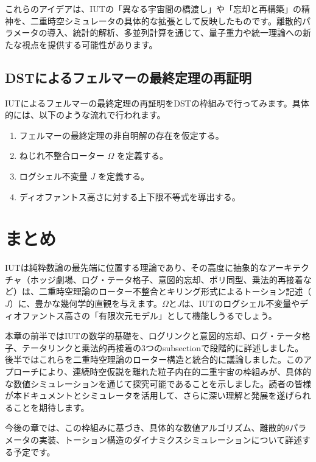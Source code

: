 \documentclass[a4paper,12pt,notitlepage]{jsreport}
\begin{document}
これらのアイデアは、IUTの「異なる宇宙間の橋渡し」や「忘却と再構築」の精神を、二重時空シミュレータの具体的な拡張として反映したものです。離散的パラメータの導入、統計的解析、多並列計算を通じて、量子重力や統一理論への新たな視点を提供する可能性があります。

\subsection{DSTによるフェルマーの最終定理の再証明}

IUTによるフェルマーの最終定理の再証明をDSTの枠組みで行ってみます。具体的には、以下のような流れで行われます。

\begin{enumerate}
  \item フェルマーの最終定理の非自明解の存在を仮定する。
  \item ねじれ不整合ローター $\Omega$ を定義する。
  \item ログシェル不変量 $J$ を定義する。
  \item ディオファントス高さに対する上下限不等式を導出する。
\end{enumerate}


\section{まとめ}

IUTは純粋数論の最先端に位置する理論であり、その高度に抽象的なアーキテクチャ（ホッジ劇場、ログ・テータ格子、意図的忘却、ポリ同型、乗法的再接着など）は、二重時空理論のローター不整合とキリング形式によるトーション記述（$J$）に、豊かな幾何学的直観を与えます。$\Omega$と$J$は、IUTのログシェル不変量やディオファントス高さの「有限次元モデル」として機能しうるでしょう。

本章の前半ではIUTの数学的基礎を、ログリンクと意図的忘却、ログ・テータ格子、テータリンクと乗法的再接着の3つのsubsectionで段階的に詳述しました。後半ではこれらを二重時空理論のローター構造と統合的に議論しました。このアプローチにより、連続時空仮説を離れた粒子内在的二重宇宙の枠組みが、具体的な数値シミュレーションを通じて探究可能であることを示しました。読者の皆様が本ドキュメントとシミュレータを活用して、さらに深い理解と発展を遂げられることを期待します。

今後の章では、この枠組みに基づき、具体的な数値アルゴリズム、離散的$\theta$パラメータの実装、トーション構造のダイナミクスシミュレーションについて詳述する予定です。
\end{document}
